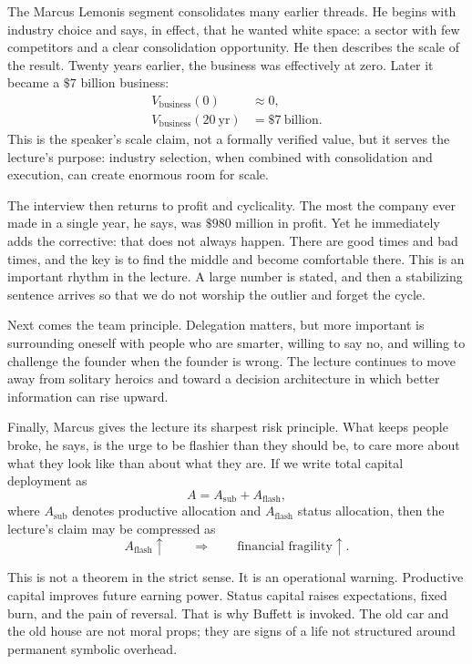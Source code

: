The Marcus Lemonis segment consolidates many earlier threads. He begins with industry choice and says, in effect, that he wanted white space: a sector with few competitors and a clear consolidation opportunity. He then describes the scale of the result. Twenty years earlier, the business was effectively at zero. Later it became a \(\$7\) billion business:
\begin{align}
V_{\text{business}}(0) &\approx 0,\\
V_{\text{business}}(20\ \text{yr}) &= \$7\ \text{billion}.
\end{align}
This is the speaker's scale claim, not a formally verified value, but it serves the lecture's purpose: industry selection, when combined with consolidation and execution, can create enormous room for scale.

The interview then returns to profit and cyclicality. The most the company ever made in a single year, he says, was \(\$980\) million in profit. Yet he immediately adds the corrective: that does not always happen. There are good times and bad times, and the key is to find the middle and become comfortable there. This is an important rhythm in the lecture. A large number is stated, and then a stabilizing sentence arrives so that we do not worship the outlier and forget the cycle.

Next comes the team principle. Delegation matters, but more important is surrounding oneself with people who are smarter, willing to say no, and willing to challenge the founder when the founder is wrong. The lecture continues to move away from solitary heroics and toward a decision architecture in which better information can rise upward.

Finally, Marcus gives the lecture its sharpest risk principle. What keeps people broke, he says, is the urge to be flashier than they should be, to care more about what they look like than about what they are. If we write total capital deployment as
\begin{equation}
A = A_{\text{sub}} + A_{\text{flash}},
\end{equation}
where \(A_{\text{sub}}\) denotes productive allocation and \(A_{\text{flash}}\) status allocation, then the lecture's claim may be compressed as
\begin{equation}
A_{\text{flash}} \uparrow
\qquad \Longrightarrow \qquad
\text{financial fragility} \uparrow.
\end{equation}

This is not a theorem in the strict sense. It is an operational warning. Productive capital improves future earning power. Status capital raises expectations, fixed burn, and the pain of reversal. That is why Buffett is invoked. The old car and the old house are not moral props; they are signs of a life not structured around permanent symbolic overhead.

